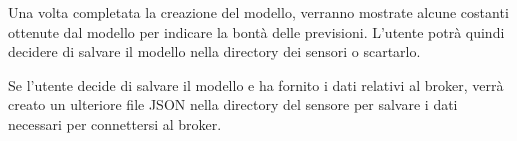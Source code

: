 \documentclass[a4paper,10pt]{article}
\begin{document}
Una volta completata la creazione del modello, verranno mostrate alcune costanti ottenute dal modello per indicare la bontà delle previsioni. L'utente potrà quindi decidere di salvare il modello nella directory dei sensori o scartarlo.

Se l'utente decide di salvare il modello e ha fornito i dati relativi al broker, verrà creato un ulteriore file JSON nella directory del sensore per salvare i dati necessari per connettersi al broker.
\end{document}
